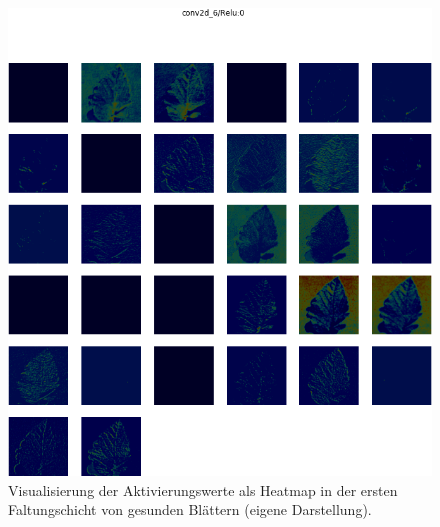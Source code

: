 
\begin{figure}[h!]
	\centering
	\includegraphics[width=\textwidth]{visualisierungen/healthy/heatmap_mit/conv2d_6.png}
	\caption{Visualisierung der Aktivierungswerte als Heatmap in der ersten Faltungschicht von gesunden Blättern (eigene Darstellung).}
	\label{}
\end{figure}

